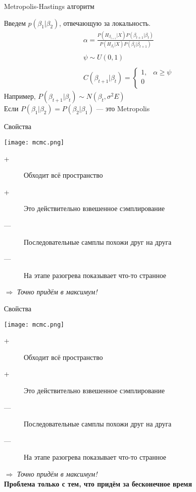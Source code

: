 \documentclass[14pt, fleqn, xcolor={dvipsnames, table}]{beamer}
\begin{document}
\begin{frame}{Metropolis-Hastings алгоритм}

Введем $p(\beta_1|\beta_2)$, отвечающую за локальность.
$$\begin{array}{l}
\alpha = \frac{P(H_{\beta_{t+1}}|X)P(\beta_{t+1}|\beta_t)}{P(H_{\beta_t}|X)P(\beta_t|\beta_{t+1})}\\
\\
\psi \sim U(0,1)\\
\\
C(\beta_{t+1}|\beta_t) = \left\{  
           \begin{array}{ll}  
            1,& \alpha \ge \psi \\  
            0 &\\  
           \end{array}   
           \right.  
\end{array}$$
Например, $P(\beta_{t+1}|\beta_t) \sim N(\beta_t,\sigma^2E)$ \\
Если $P(\beta_1 | \beta_2) = P(\beta_2 | \beta_1)$ --- это Metropolis \\ 
\end{frame}

\begin{frame}{Свойства}
\begin{center}
\texttt{[image: mcmc.png]}
\end{center}
\footnotesize
\begin{description}
  \item[\color{green}+] Обходит всё пространство
  \item[\color{green}+] Это действительно взвешенное сэмплирование
  \item[\color{red}---] Последовательные самплы похожи друг на друга
  \item[\color{red}---] На этапе разогрева показывает что-то странное
\end{description}
$\Rightarrow$ \textit{Точно придём в максимум!} \\
\end{frame}

\begin{frame}{Свойства}
\begin{center}
\texttt{[image: mcmc.png]}
\end{center}
\footnotesize
\begin{description}
  \item[\color{green}+] Обходит всё пространство
  \item[\color{green}+] Это действительно взвешенное сэмплирование
  \item[\color{red}---] Последовательные самплы похожи друг на друга
  \item[\color{red}---] На этапе разогрева показывает что-то странное
\end{description}
$\Rightarrow$ \textit{Точно придём в максимум!} \\
\textbf{Проблема только с тем, что придём за бесконечное время}
\end{frame}
\end{document}
